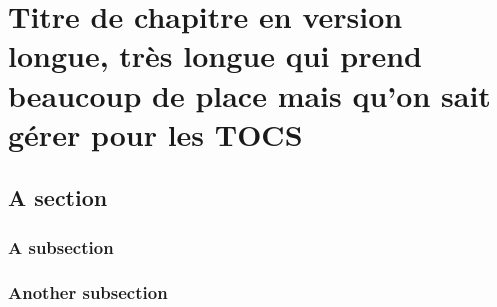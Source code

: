 
\chapter[Version courte d'un titre long]
{Titre de chapitre en version longue, très longue qui prend beaucoup de place mais qu'on sait gérer pour les TOCS}
\label{chap:achapter}

\myminitoc

\section{A section}

\subsection{A subsection}

\subsection{Another subsection}
\lipsum